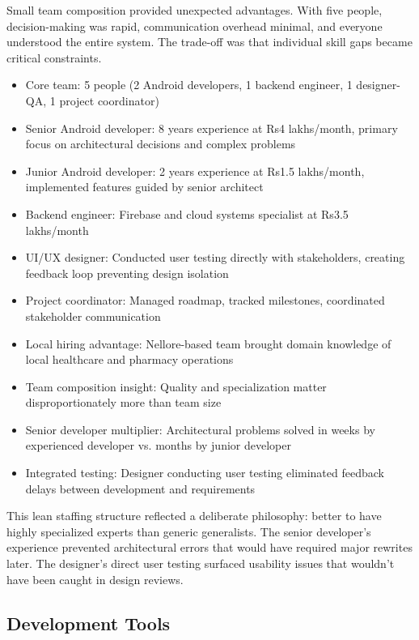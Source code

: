 \documentclass[12pt,a4paper]{report}
\begin{document}
Small team composition provided unexpected advantages. With five people, decision-making was rapid, communication overhead minimal, and everyone understood the entire system. The trade-off was that individual skill gaps became critical constraints.

\begin{itemize}
  \item Core team: 5 people (2 Android developers, 1 backend engineer, 1 designer-QA, 1 project coordinator)
  \item Senior Android developer: 8 years experience at Rs4 lakhs/month, primary focus on architectural decisions and complex problems
  \item Junior Android developer: 2 years experience at Rs1.5 lakhs/month, implemented features guided by senior architect
  \item Backend engineer: Firebase and cloud systems specialist at Rs3.5 lakhs/month
  \item UI/UX designer: Conducted user testing directly with stakeholders, creating feedback loop preventing design isolation
  \item Project coordinator: Managed roadmap, tracked milestones, coordinated stakeholder communication
  \item Local hiring advantage: Nellore-based team brought domain knowledge of local healthcare and pharmacy operations
  \item Team composition insight: Quality and specialization matter disproportionately more than team size
  \item Senior developer multiplier: Architectural problems solved in weeks by experienced developer vs. months by junior developer
  \item Integrated testing: Designer conducting user testing eliminated feedback delays between development and requirements
\end{itemize}

This lean staffing structure reflected a deliberate philosophy: better to have highly specialized experts than generic generalists. The senior developer's experience prevented architectural errors that would have required major rewrites later. The designer's direct user testing surfaced usability issues that wouldn't have been caught in design reviews.

\subsection{Development Tools}
\end{document}
